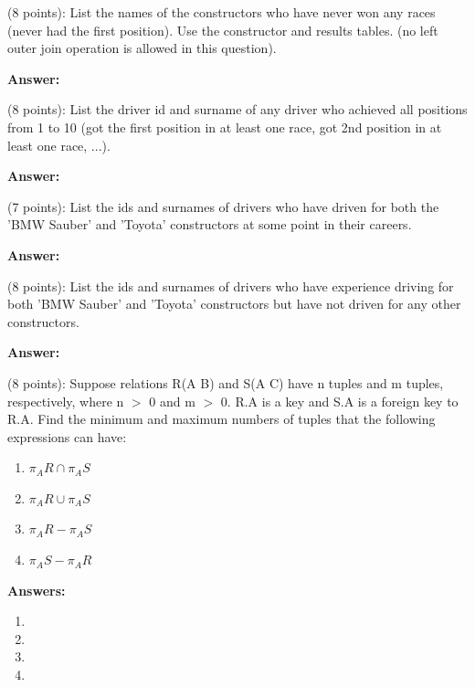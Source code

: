 \documentclass[12pt]{exam}
\begin{document}
\begin{questions}
\newpage
    

\question (8 points): List the names of the constructors who have never won any races (never had the first position). Use the constructor and results tables. (no left outer join operation is allowed in this question).

\textbf{Answer:} \\

\newpage


\question (8 points): List the driver id and surname of any driver who achieved all positions from 1 to 10 (got the first position in at least one race, got 2nd position in at least one race, ...).  

\textbf{Answer:} \\

\newpage


\question (7 points): List the ids and surnames of drivers who have driven for both the 'BMW Sauber' and 'Toyota' constructors at some point in their careers.

\textbf{Answer:} \\

\newpage


\question (8 points): List the ids and surnames of drivers who have experience driving for both 'BMW Sauber' and 'Toyota' constructors but have not driven for any other constructors.

\textbf{Answer:} \\

\newpage

\question (8 points): Suppose relations R(A B) and S(A C) have n tuples and m tuples, respectively, where n $>$ 0 and m $>$ 0.  R.A is a key and S.A is a foreign key to R.A. Find the minimum and maximum numbers of tuples that the following expressions can have:

\begin{enumerate}
  \item $\pi_{A}R \cap \pi_{A}S$ 
  \item $\pi_{A}R \cup \pi_{A}S$ 
  \item $\pi_{A}R - \pi_{A}S$ 
  \item $\pi_{A}S - \pi_{A}R$ 
\end{enumerate}

\textbf{Answers:} 
\begin{enumerate}
    \item 
    \item 
    \item 
    \item 
\end{enumerate}


\end{questions}
\bigskip 
\noindent
\end{document}
